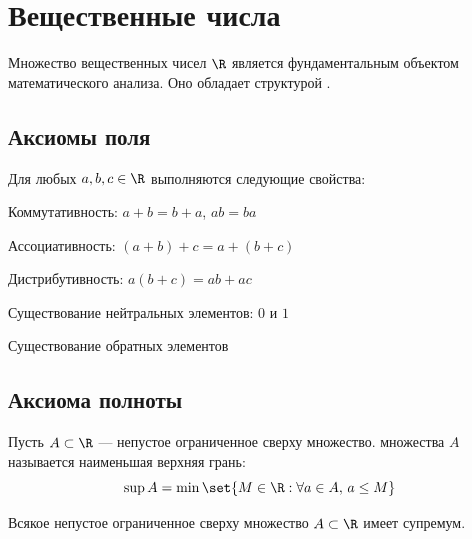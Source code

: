


\section{Вещественные числа}

Множество вещественных чисел $\R$ является фундаментальным объектом математического анализа. Оно обладает структурой .

\subsection{Аксиомы поля}

Для любых $a, b, c \in \R$ выполняются следующие свойства:

\begin{enum}
    \item Коммутативность: $a + b = b + a$, \quad $ab = ba$
    \item Ассоциативность: $(a+b)+c = a+(b+c)$
    \item Дистрибутивность: $a(b+c) = ab + ac$
    \item Существование нейтральных элементов: $0$ и $1$
    \item Существование обратных элементов
\end{enum}

\subsection{Аксиома полноты}

\begin{defn}[Супремум]
Пусть $A \subset \R$ — непустое ограниченное сверху множество.  множества $A$ называется наименьшая верхняя грань:
\[
    \sup A = \min\set{M \in \R : \forall a \in A,\, a \leq M}
\]
\end{defn}

\begin{thm}[О супремуме]
Всякое непустое ограниченное сверху множество $A \subset \R$ имеет супремум.
\end{thm}


